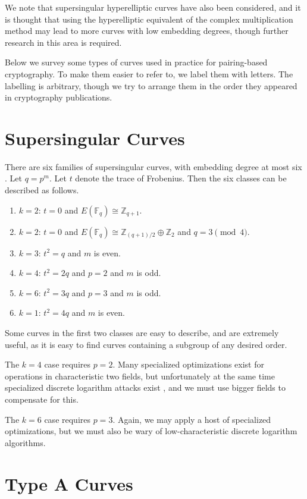 We note that supersingular hyperelliptic curves have also been considered,
and it is thought that using the hyperelliptic equivalent of the
complex multiplication method may lead to more curves with low
embedding degrees, though further research in this area is required.

Below we survey some types of curves used in practice for pairing-based
cryptography. To make them easier to refer to, we label them with letters.
The labelling is arbitrary, though we try to arrange them in the order
they appeared in cryptography publications.

\section {Supersingular Curves}

There are six families of supersingular curves, with embedding degree at
most six \cite{mov}. Let $q=p^m$. Let $t$ denote the trace of Frobenius.
Then the six classes can be described as follows.

\begin{enumerate}
\item
$k = 2$: $ t = 0$ and $E(\mathbb{F}_q) \cong \mathbb{Z}_{q+1}$.
\item
$k = 2$: $ t = 0$ and $E(\mathbb{F}_q) \cong \mathbb{Z}_{(q+1)/2} \oplus \mathbb{Z}_2$ and $q = 3 \pmod{4}$.
\item
$k = 3$: $ t^2 = q$ and $m$ is even.
\item
$k = 4$: $ t^2 = 2q$ and $p = 2$ and $m$ is odd.
\item
$k = 6$: $ t^2 = 3q$ and $p = 3$ and $m$ is odd.
\item
$k = 1$: $ t^2 = 4q$ and $m$ is even.
\end{enumerate}

Some curves in the first two classes are easy to describe, and are
extremely useful, as it is easy to find curves containing a
subgroup of any desired order.

The $k=4$ case requires $p=2$.
Many specialized optimizations exist for
operations in characteristic two fields,
but unfortunately at the same time specialized discrete logarithm attacks
exist \cite{coppersmith}, and we must use bigger fields to compensate for
this. 

The $k=6$ case requires $p=3$. Again, we may apply
a host of specialized optimizations, but we must also be wary of
low-characteristic discrete logarithm algorithms.

\section {Type A Curves}

